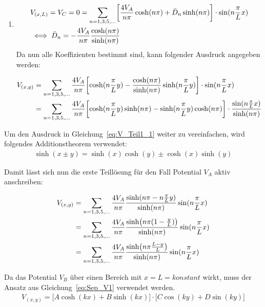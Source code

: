 \begin{enumerate}
	\item \begin{align}
		&V_{(x,L)} = V_C = 0 = \sum_{n = 1,3,5,...} \biggl[ \frac{4V_A}{n \pi} \cosh(n \pi) + \bar{D}_n \sinh(n \pi) \biggr] \cdot \sin(n \frac{\pi}{L} x) \\
		&\iff \bar{D}_n = - \frac{4V_A}{n \pi} \frac{\cosh(n \pi)}{\sinh(n \pi)} \notag
	\end{align}
	Da nun alle Koeffizienten bestimmt sind, kann folgender Ausdruck angegeben werden:
	
	\begin{align}
		V_{(x,y)} &= \sum_{n = 1,3,5,...} \frac{4V_A}{n \pi} \biggl[\cosh(n \frac{\pi}{L} y) - \frac{\cosh(n \pi)}{\sinh(n \pi)} \sinh(n \frac{\pi}{L} y) \biggr] \cdot \sin(n \frac{\pi}{L} x) \\
		&= \sum_{n = 1,3,5,...} \frac{4V_A}{n \pi} \biggl[\cosh(n \frac{\pi}{L} y) \sinh(n \pi) - \sinh(n \frac{\pi}{L} y) \cosh(n \pi) \biggr] \cdot \frac{\sin(n \frac{\pi}{L} x)}{\sinh(n \pi)} \notag
	\end{align}
\end{enumerate}

Um den Ausdruck in Gleichung~\ref{eq:V_Teil1_1} weiter zu vereinfachen, wird folgendes Additionstheorem verwendet:
\begin{align}
	\sinh(x \pm y) = \sinh(x)\cosh(y) \pm \cosh(x)\sinh(y)
\end{align}

Damit lässt sich nun die erste Teillösung für den Fall Potential $V_A$ aktiv anschreiben:

\begin{align}
	V_{(x,y)} &= \sum_{n = 1,3,5,...} \frac{4V_A}{n \pi} \frac{\sinh(n \pi - n \frac{\pi}{L} y)}{\sinh(n \pi)} \sin(n \frac{\pi}{L} x) \\
	&= \sum_{n = 1,3,5,...} \frac{4V_A}{n \pi} \frac{\sinh \bigl(n \pi (1 - \frac{y}{L})\bigr)}{\sinh(n \pi)} \sin(n \frac{\pi}{L} x) \notag \\
	&= \sum_{n = 1,3,5,...} \frac{4V_A}{n \pi} \frac{\sinh \bigl(n \pi \frac{L-y}{L}\bigr)}{\sinh(n \pi)} \sin(n \frac{\pi}{L} x) \label{eq:V_Teil1_1} \notag
\end{align}

Da das Potential $V_B$ über einen Bereich mit $x = L = konstant$ wirkt, muss der Ansatz aus Gleichung~\ref{eq:Sep_V1} verwendet werden. 
\begin{align}
	V_{(x,y)} = \bigl[A\cosh(kx) + B\sinh(kx)\bigr] \cdot \bigl[C\cos(ky) + D\sin(ky)\bigr]
\end{align}

